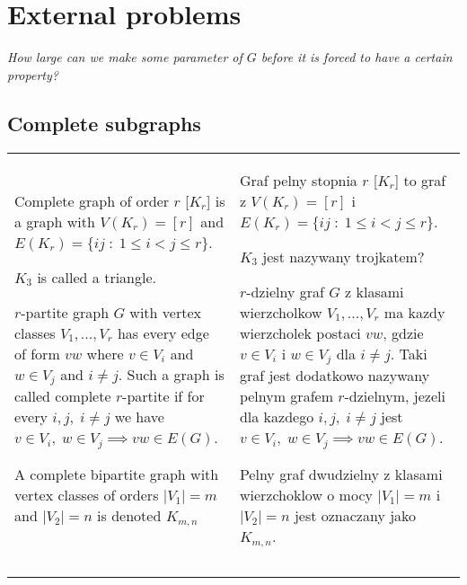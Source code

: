 \section{External problems}

\pdef

    \emph{How large can we make some parameter of $G$ before it is forced to have a certain property?}

\kdef

\subsection{Complete subgraphs}

\begin{tabularx}{\textwidth}{ X!{\color{git90gray}\vrule} X }

{\color{def}Complete graph of order $r$} [$K_r$] is a graph with $V(K_r)=[r]$ and $E(K_r)=\{ij\;:\;1\leq i<j\leq r\}$.

$K_3$ is called a {\color{acc}triangle}.
\medskip

{\color{def}$r$-partite} graph $G$ with vertex classes $V_1,...,V_r$ has every edge of form $vw$ where $v\in V_i$ and $w\in V_j$ and $i\neq j$. Such a graph is called {\color{acc}complete $r$-partite} if for every $i,j,\;i\neq j$ we have $v\in V_i,\;w\in V_j\implies vw\in E(G)$.
\medskip

A {\color{def}complete bipartite graph} with vertex classes of orders $|V_1|=m$ and $|V_2|=n$ is denoted $K_{m,n}$

&

{\color{def}Graf pelny stopnia $r$} [$K_r$] to graf z $V(K_r)=[r]$ i $E(K_r)=\{ij\;:\;1\leq i<j\leq r\}$.

$K_3$ jest nazywany {\color{dyg}trojkatem}?
\medskip

{\color{def}$r$-dzielny} graf $G$ z klasami wierzcholkow $V_1,...,V_r$ ma kazdy wierzcholek postaci $vw$, gdzie $v\in V_i$ i $w\in V_j$ dla $i\neq j$. Taki graf jest dodatkowo nazywany {\color{acc}pelnym grafem $r$-dzielnym}, jezeli dla kazdego $i,j,\;i\neq j$ jest $v\in V_i,\;w\in V_j\implies vw\in E(G)$.
\medskip

{\color{def}Pelny graf dwudzielny} z klasami wierzchoklow o mocy $|V_1|=m$ i $|V_2|=n$ jest oznaczany jako $K_{m,n}$.
\\

& \\

\hline

& \\


\end{tabularx}
